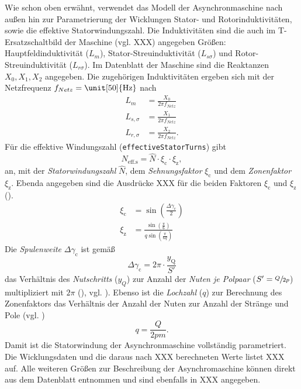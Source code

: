 Wie schon oben erwähnt, verwendet das Modell der Asynchronmaschine nach
außen hin zur Parametrierung der Wicklungen Stator- und
Rotorinduktivitäten, sowie die effektive Statorwindungszahl. Die
Induktivitäten sind die auch im T-Ersatzschaltbild der Maschine (vgl.
XXX) angegeben Größen: Hauptfeldinduktivität (\(L_m\)),
Stator-Streuinduktivität (\(L_{s\sigma}\)) und Rotor-Streuinduktivität
(\(L_{r\sigma}\)). Im Datenblatt der Maschine sind die Reaktanzen
\(X_0, X_1, X_2\) angegeben. Die zugehörigen Induktivitäten ergeben sich
mit der Netzfrequenz \(f_{Netz}=\unit[50]{\mathrm{Hz}}\) nach
\begin{align}
L_m &= \frac{X_0}{2\pi f_{Netz}} \\
L_{s,\sigma} &= \frac{X_1}{2\pi f_{Netz}} \\
L_{r,\sigma} &= \frac{X_2}{2\pi f_{Netz}}.
\end{align}
Für die effektive Windungszahl (\texttt{effectiveStatorTurns}) gibt
\cite[S. 217]{kralModelicaObjektorientierteModellbildung2019}
\begin{equation}
N_{\mathrm{eff. s}} = \hat{N}\cdot\xi_{\mathrm{c}}\cdot\xi_{\mathrm{z}},
\end{equation}
an, mit der \emph{Statorwindungszahl} \(\hat{N}\), dem
\emph{Sehnungsfaktor} \(\xi _{\mathrm{c}}\) und dem \emph{Zonenfaktor}
\(\xi _{\mathrm{z}}\). Ebenda angegeben sind die Ausdrücke XXX für die
beiden Faktoren \(\xi _{\mathrm{c}}\) und \(\xi_{\mathrm{z}}\)
(\cite[S. 165, S. 217]{kralModelicaObjektorientierteModellbildung2019}).
\begin{align}
\xi _{\mathrm{c}} &= \sin(\frac{\Delta\gamma _{\mathrm{c}}}{2}) \\
\xi _{\mathrm{z}} &= \frac{\sin(\frac{\pi}{6})}{q\sin(\frac{\pi}{6q})}
\end{align}
Die \emph{Spulenweite} \(\Delta\gamma _{\mathrm{c}}\) ist gemäß
\begin{equation}
\Delta\gamma _{\mathrm{c}} = 2\pi\cdot\frac{y _{\mathrm{Q}}}{S'}
\end{equation}
das Verhältnis des \emph{Nutschritts} (\(y_Q\)) zur Anzahl der
\emph{Nuten je Polpaar} (\(S'=\sfrac{Q}{2p}\)) multipliziert mit
\(2\pi\)
(\cite[S. 168, S. 161]{kralModelicaObjektorientierteModellbildung2019}),
vgl. \cite[S. 76, S. 119]{binderElektrischeMaschinenUnd2012}). Ebenso
ist die \emph{Lochzahl} (\(q\)) zur Berechnung des Zonenfaktors das
Verhältnis der Anzahl der Nuten zur Anzahl der Stränge und Pole (vgl.
\cite[S. 151]{kralModelicaObjektorientierteModellbildung2019})
\begin{equation}
q = \frac{Q}{2pm}.
\end{equation}
Damit ist die Statorwindung der Asynchronmaschine vollständig
parametriert. Die Wicklungsdaten und die daraus nach XXX berechneten
Werte listet XXX auf. Alle weiteren Größen zur Beschreibung der
Asynchromaschine können direkt aus dem Datenblatt entnommen und sind
ebenfalls in XXX angegeben.

